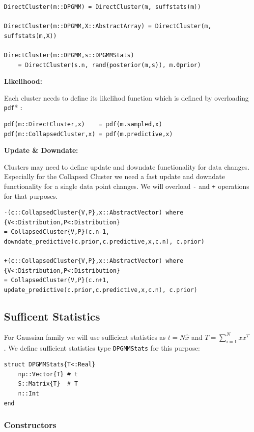 \documentclass[a4paper]{article}
\begin{document}
\begin{lstlisting}
DirectCluster(m::DPGMM) = DirectCluster(m, suffstats(m))

DirectCluster(m::DPGMM,X::AbstractArray) = DirectCluster(m, suffstats(m,X))

DirectCluster(m::DPGMM,s::DPGMMStats) 
    = DirectCluster(s.n, rand(posterior(m,s)), m.θprior)
\end{lstlisting}

\textbf{Likelihood:}

Each cluster needs to define its likelihod function which is defined by
overloading \texttt{pdf}* :
\begin{lstlisting}
pdf(m::DirectCluster,x)    = pdf(m.sampled,x)
pdf(m::CollapsedCluster,x) = pdf(m.predictive,x)
\end{lstlisting}

\textbf{Update \& Downdate:}

Clusters may need to define update and downdate functionality for data
changes. Especially for the Collapsed Cluster we need a fast update and
downdate functionality for a single data point changes. We will overload
\texttt{-} and \texttt{+} operations for that purposes.
\begin{lstlisting}[linewidth=18cm]
-(c::CollapsedCluster{V,P},x::AbstractVector) where {V<:Distribution,P<:Distribution} 
= CollapsedCluster{V,P}(c.n-1, downdate_predictive(c.prior,c.predictive,x,c.n), c.prior)

+(c::CollapsedCluster{V,P},x::AbstractVector) where {V<:Distribution,P<:Distribution} 
= CollapsedCluster{V,P}(c.n+1, update_predictive(c.prior,c.predictive,x,c.n), c.prior)
\end{lstlisting}



\subsection{Sufficent Statistics}

For Gaussian family we will use sufficient statistics as \(t =N\hat{x}\)
and \(T=\sum_{i=1}^Nxx^T\) . We define sufficient statistics type
\texttt{DPGMMStats} for this purpose:


\begin{lstlisting}[linewidth=8cm]
struct DPGMMStats{T<:Real}
    nμ::Vector{T} # t
    S::Matrix{T}  # T
    n::Int
end
\end{lstlisting}

\subsubsection{Constructors}
\end{document}
